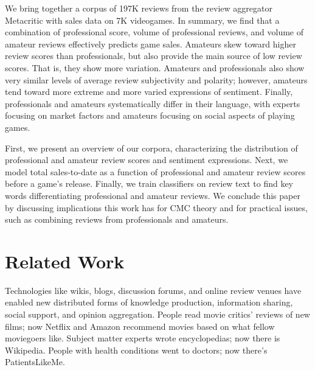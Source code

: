 \documentclass[letterpaper]{article}
\begin{document}
We bring together a corpus of 197K reviews from 
the review aggregator Metacritic with sales data on 7K videogames. In summary, we find that a
combination of professional score, volume of professional reviews,
and volume of amateur reviews effectively predicts game sales. Amateurs
skew toward higher review scores than professionals, but also
provide the main source of low review scores. That is, they show more
variation. Amateurs and professionals also show very similar levels of
average review subjectivity and polarity; however, amateurs tend toward
more extreme and more varied expressions of sentiment. Finally,
professionals and amateurs systematically differ in their language, with
experts focusing on market factors and amateurs focusing on
social aspects of playing games.

First, we present an overview of our corpora, characterizing the
distribution of professional and amateur review scores and sentiment
expressions. Next, we model total sales-to-date as a function of 
professional and amateur review scores before a game's release. Finally,
we train classifiers on review text to find key words differentiating
professional and amateur reviews. We conclude this paper by discussing
implications this work has for CMC theory and for practical
issues, such as combining reviews from professionals and amateurs.

\section{Related Work}
Technologies like wikis, blogs, discussion forums, and online review venues have enabled new distributed forms of knowledge production, information sharing, social support, and opinion aggregation. People read movie critics' reviews of new films; now Netflix and Amazon recommend movies based on what fellow moviegoers like. Subject matter experts wrote encyclopedias; now there is Wikipedia. People with health conditions went to doctors; now there's PatientsLikeMe. 
\end{document}
